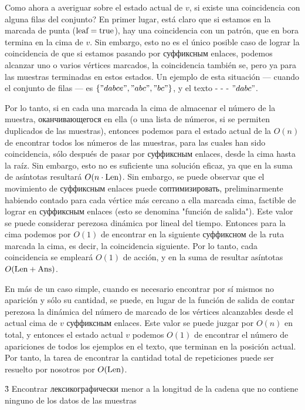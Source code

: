 Como ahora a averiguar sobre el estado actual de $v$, si existe una coincidencia con alguna filas del conjunto? En primer lugar, está claro que si estamos en la marcada de punta ($\rm leaf=true$), hay una coincidencia con un patrón, que en bora termina en la cima de $v$. Sin embargo, esto no es el único posible caso de lograr la coincidencia de que si estamos pasando por суффиксным enlaces, podemos alcanzar uno o varios vértices marcados, la coincidencia también se, pero ya para las muestras terminadas en estos estados. Un ejemplo de esta situación --- cuando el conjunto de filas --- es $\{ "dabce", "abc", "bc" \}$, y el texto - - - $"dabc"$.

Por lo tanto, si en cada una marcada la cima de almacenar el número de la muestra, оканчивающегося en ella (o una lista de números, si se permiten duplicados de las muestras), entonces podemos para el estado actual de la $O (n)$ de encontrar todos los números de las muestras, para las cuales han sido coincidencia, sólo después de pasar por суффиксным enlaces, desde la cima hasta la raíz. Sin embargo, esto no es suficiente una solución eficaz, ya que en la suma de asíntotas resultará $O (n \cdot {\rm Len})$. Sin embargo, se puede observar que el movimiento de суффиксным enlaces puede соптимизировать, preliminarmente habiendo contado para cada vértice más cercano a ella marcada cima, factible de lograr en суффиксным enlaces (esto se denomina "función de salida"). Este valor se puede considerar perezosa dinámica por lineal del tiempo. Entonces para la cima podemos por $O (1)$ de encontrar en la siguiente суффиксном de la ruta marcada la cima, es decir, la coincidencia siguiente. Por lo tanto, cada coincidencia se empleará $O (1)$ de acción, y en la suma de resultar asíntotas $O ({\rm Len + Ans})$.

En más de un caso simple, cuando es necesario encontrar por sí mismos no aparición y sólo su cantidad, se puede, en lugar de la función de salida de contar perezosa la dinámica del número de marcado de los vértices alcanzables desde el actual cima de $v$ суффиксным enlaces. Este valor se puede juzgar por $O (n)$ en total, y entonces el estado actual $v$ podemos $O (1)$ de encontrar el número de apariciones de todos los ejemplos en el texto, que terminan en la posición actual. Por tanto, la tarea de encontrar la cantidad total de repeticiones puede ser resuelto por nosotros por $O ({\rm Len})$.


\h3{ Encontrar лексикографически menor a la longitud de la cadena que no contiene ninguno de los datos de las muestras }

